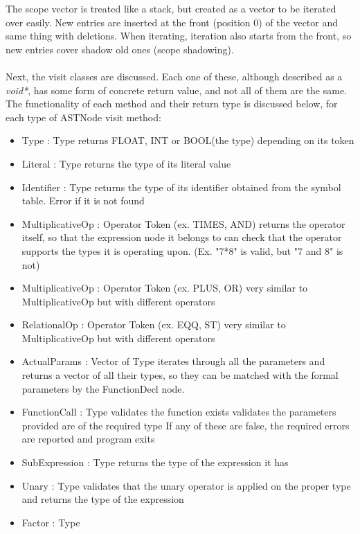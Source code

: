 The scope vector is treated like a stack, but created as a vector to be iterated over easily. New entries are inserted at the front (position 0) of the vector and same thing with deletions. When iterating, iteration also starts from the front, so new entries cover shadow old ones (scope shadowing).
\\\\
Next, the visit classes are discussed. Each one of these, although described as a \textit{void*}, has some form of concrete return value, and not all of them are the same. The functionality of each method and their return type is discussed below, for each type of ASTNode visit method:
\begin{itemize}
	\item Type : Type 
		\subitem returns FLOAT, INT or BOOL(the type) depending on its token
	\item Literal : Type
		\subitem returns the type of its literal value
	\item Identifier : Type
		\subitem returns the type of its identifier obtained from the symbol table. Error if it is not found
	\item MultiplicativeOp : Operator Token (ex. TIMES, AND)
		\subitem returns the operator itself, so that the expression node it belongs to can check that the operator supports the types it is operating upon. (Ex. "7*8" is valid, but "7 and 8" is not)
	\item MultiplicativeOp : Operator Token (ex. PLUS, OR)
		\subitem very similar to MultiplicativeOp but with different operators
	\item RelationalOp : Operator Token (ex. EQQ, ST)
		\subitem very similar to MultiplicativeOp but with different operators
	\item ActualParams : Vector of Type
		\subitem iterates through all the parameters and returns a vector of all their types, so they can be matched with the formal parameters by the FunctionDecl node.
	\item FunctionCall : Type
		\subitem validates the function exists
		\subitem validates the parameters provided are of the required type
		\subitem If any of these are false, the required errors are reported and program exits
	\item SubExpression : Type
		\subitem returns the type of the expression it has
	\item Unary : Type
		\subitem validates that the unary operator is applied on the proper type and returns the type of the expression
	\item Factor : Type

\end{itemize}

